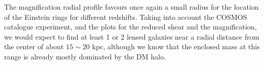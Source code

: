The magnification radial profile favours once again a small radius for the location of the Einstein rings for different redshifts. Taking into account the COSMOS catalogue experiment, and the plots for the reduced shear and the magnification, we would expect to find at least 1 or 2 lensed galaxies near a radial distance from the center of about $15\sim 20$ kpc, although we know that the enclosed mass at this range is already mostly dominated by the DM halo. 


